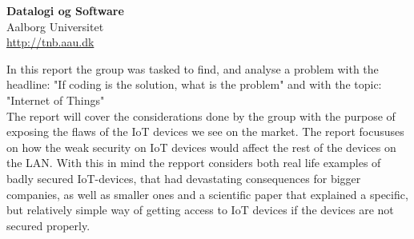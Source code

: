 {%
  \textbf{Datalogi og Software}\\
  Aalborg Universitet\\
  \href{http://tnb.aau.dk}{http://tnb.aau.dk}
}{%
    In this report the group was tasked to find, and analyse a problem with the headline: "If coding is the solution, what is the problem" and with the topic: "Internet of Things"\\
    The report will cover the considerations done by the group with the purpose of exposing the flaws of the IoT devices we see on the market. The report focususes on how the weak security on IoT devices would affect the rest of the devices on the LAN. With this in mind the repport considers both real life examples of badly secured IoT-devices, that had devastating consequences for bigger companies, as well as smaller ones and a scientific paper that explained a specific, but relatively simple way of getting access to IoT devices if the devices are not secured properly.
  

}